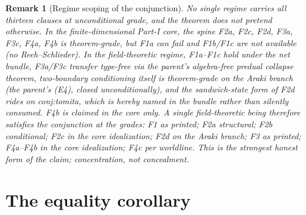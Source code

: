 \documentclass[11pt]{article}
\newtheorem{remark}{Remark}
\begin{document}
\begin{remark}[Regime scoping of the conjunction]\label{rem:regimes}
No single regime carries all thirteen clauses at unconditional grade, and the
theorem does not pretend otherwise. In the finite-dimensional Part-I core, the
spine F2a, F2c, F2d, F3a, F3c, F4a, F4b is theorem-grade, but F1a can fail and
F1b/F1c are not available (no Reeh--Schlieder). In the field-theoretic regime,
F1a--F1c hold under the net bundle, F3a/F3c transfer type-free via the parent's
algebra-free predual collapse theorem, two-boundary conditioning itself is
theorem-grade on the Araki branch (the parent's (E4), closed unconditionally),
and the sandwich-state form of F2d rides on \textsf{conj:tomita}, which is
hereby named in the bundle rather than silently consumed. F4b is claimed in the
core only. A single field-theoretic being therefore satisfies the conjunction
at the grades: F1 as printed; F2a structural; F2b conditional; F2c in the core
idealization; F2d on the Araki branch; F3 as printed; F4a--F4b in the core
idealization; F4c per worldline. This is the strongest honest form of the claim; concentration, not
concealment.
\end{remark}

\section{The equality corollary}\label{sec:equality}
\end{document}
